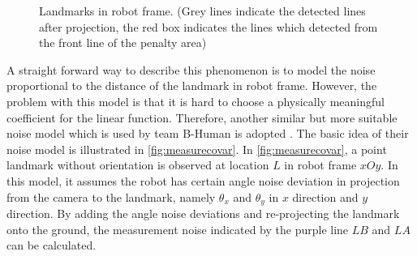 \begin{figure}[h!]
  \centering
{}
  \caption{Landmarks in robot frame. (Grey lines indicate the detected lines after projection, the red box indicates the lines which detected from the front line of the penalty area)}
  \label{fig:landmarkRobotFrame}
\end{figure}

A straight forward way to describe this phenomenon is to model the noise proportional to the distance of the landmark in robot frame. However, the problem with this model is that it is hard to choose a physically meaningful coefficient for the linear function. Therefore, another similar but more suitable noise model which is used by team B-Human is adopted \cite{Bhuman}. The basic idea of their noise model is illustrated in \autoref{fig:measurecovar}. In \autoref{fig:measurecovar}, a point landmark without orientation is observed at location $L$ in robot frame $xOy$. In this model, it assumes the robot has certain angle noise deviation in projection from the camera to the landmark, namely $\theta_{x}$ and $\theta_{y}$ in $x$ direction and $y$ direction. By adding the angle noise deviations and re-projecting the landmark onto the ground, the measurement noise indicated by the purple line $LB$ and $LA$ can be calculated. 

